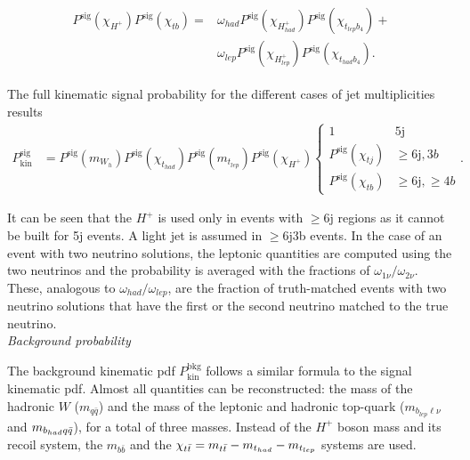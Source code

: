 \begin{align}
    \begin{split}
        P^{\text{sig}}(\chi_{H^+})P^{\text{sig}}(\chi_{tb})=&\omega_{had}P^{\text{sig}}(\chi_{H^+_{had}})P^{\text{sig}}(\chi_{t_{lep}b_4})+\\
        &\omega_{lep}P^{\text{sig}}(\chi_{H^+_{lep}})P^{\text{sig}}(\chi_{t_{had}b_4}).
    \end{split}
\end{align}

The full kinematic signal probability for the different cases of jet multiplicities results
\begin{align}
    P_{\text{kin}}^{\text{sig}}&=P^{\text{sig}}(m_{W_h})P^{\text{sig}}(\chi_{t_{had}})P^{\text{sig}}(m_{t_{lep}})P^{\text{sig}}(\chi_{H^+})\begin{cases}1 & 5\text{j} \\ P^{\text{sig}}(\chi_{tj})&\geq6\text{j},3b\\P^{\text{sig}}(\chi_{tb})& \geq6\text{j},\geq4b\end{cases}.
\end{align}

It can be seen that the $H^+$ is used only in events with $\geq$6j regions as it cannot be built for 5j events. A light jet is assumed in $\geq$6j3b events. In the case of an event with two neutrino solutions, the leptonic quantities are computed using the two neutrinos and the probability is averaged with the fractions of $\omega_{1\nu}/\omega_{2\nu}$. These, analogous to $\omega_{had}/\omega_{lep}$, are the fraction of truth-matched events with two neutrino solutions that have the first or the second neutrino matched to the true neutrino.\\


\textit{Background probability}

The background kinematic pdf $P_{\text{kin}}^{\text{bkg}}$ follows a similar formula to the signal kinematic pdf. Almost all quantities can be reconstructed: the mass of the hadronic $W$ ($m_{q\bar{q}}$) and the mass of the leptonic and hadronic top-quark ($m_{b_{lep}\ell\nu}$ and $m_{b_{had}q\Bar{q}}$), for a total of three masses. Instead of the $H^+$ boson mass and its recoil system, the $m_{b\bar{b}}$ and the $\chi_{t\bar{t}}=m_{t\bar{t}}-m_{t_{had}}-m_{t_{lep}}$ systems are used.\\

